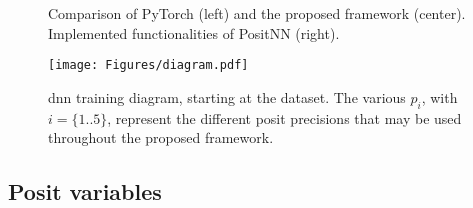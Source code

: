 \documentclass{article}
\begin{document}
	\begin{figure*}[htb]
		\begin{minipage}[b]{.69\textwidth}
			{}
		\end{minipage}%
		\hfill
		\caption{Comparison of PyTorch (left) and the proposed framework (center). Implemented functionalities of PositNN (right).}
		\vspace*{-1\baselineskip}
		\label{fig:framework}
	\end{figure*}
	
	
	\begin{figure}[htb]
		\centering
		\texttt{[image: Figures/diagram.pdf]}
		\vspace*{-0.5\baselineskip}
		\caption{\gls{dnn} training diagram, starting at the dataset. The various $p_i$, with $i=\{1..5\}$, represent the different posit precisions that may be used throughout the proposed framework.}
		\vspace*{-0.5\baselineskip}
		\label{fig:diagram}
	\end{figure}
	
	\subsection{Posit variables}
	
\end{document}
